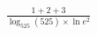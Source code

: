 \documentclass[preview]{standalone}
\begin{document}
\begin{align*}
\frac{1+2+3}{\log_{525}(525)\times \ln e^{2}}
\end{align*}
\end{document}
